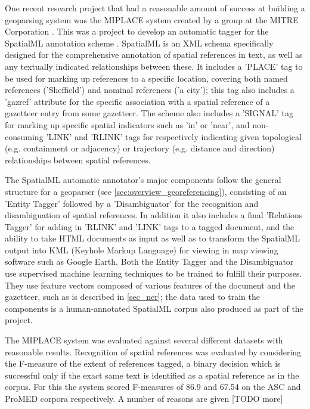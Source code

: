 \documentclass[12pt, a4paper]{report}
\begin{document}
One recent research project that had a reasonable amount of success at building a geoparsing system was the MIPLACE system created by a group at the MITRE Corporation \citep{mani2010}. This was a project to develop an automatic tagger for the SpatialML annotation scheme \citep{spatialml2009}. SpatialML is an XML schema specifically designed for the comprehensive annotation of spatial references in text, as well as any textually indicated relationships between these. It includes a 'PLACE' tag to be used for marking up references to a specific location, covering both named references ('Sheffield') and nominal references ('a city'); this tag also includes a 'gazref' attribute for the specific association with a spatial reference of a gazetteer entry from some gazetteer. The scheme also includes a 'SIGNAL' tag for marking up specific spatial indicators such as 'in' or 'near', and non-consuming 'LINK' and 'RLINK' tags for respectively indicating given topological (e.g. containment or adjacency) or trajectory (e.g. distance and direction) relationships  between  spatial references.

The SpatialML automatic annotator's major components follow the general structure for a geoparser (see \ref{sec:overview_georeferencing}), consisting of an 'Entity Tagger' followed by a 'Disambiguator' for the recognition and disambiguation of spatial references. In addition it also includes a final 'Relations Tagger' for adding in 'RLINK' and 'LINK' tags to a tagged document, and the ability to take HTML documents as input as well as to transform the SpatialML output into KML (Keyhole Markup Language) for viewing in map viewing software such as Google Earth. Both the Entity Tagger and the Disambiguator use supervised machine learning techniques to be trained to fulfill their purposes. They use feature vectors composed of various features of the document and the gazetteer, such as is described in \ref{sec_ner}; the data used to train the components is a human-annotated SpatialML corpus also produced as part of the project.


The MIPLACE system was evaluated against several different datasets with reasonable results. Recognition of spatial references was evaluated by considering the F-measure of the extent of references tagged, a binary decision which is successful only if the exact same text is identified as a spatial reference as in the corpus. For this the system scored F-measures of 86.9 and 67.54 on the ASC and ProMED corpora respectively. A number of reasons are given [TODO more]
\end{document}
